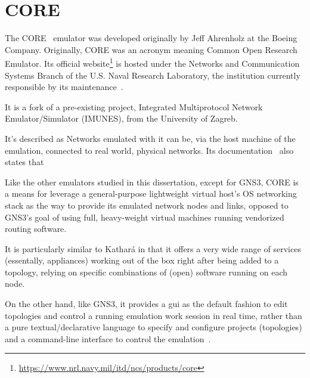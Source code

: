 \section{CORE}
\label{sec:exemulcore}

The CORE~\cite{coreemulator} emulator was developed originally by Jeff Ahrenholz at the Boeing Company.
Originally, CORE was an acronym meaning Common Open Research Emulator.
Its official website\footnote{\url{https://www.nrl.navy.mil/itd/ncs/products/core}} is hosted under the Networks and Communication Systems Branch of the U.S. Naval Research Laboratory, the institution currently responsible by its maintenance~\cite{Peach2016AnOO}.

It is a fork of a pre-existing project, Integrated Multiprotocol Network Emulator/Simulator (IMUNES), from the University of Zagreb.

It's described as 
Networks emulated with it can be, via the host machine of the emulation, connected to real world, physical networks.
Its documentation~\cite{coreghdocs} also states that 

Like the other emulators studied in this dissertation, except for GNS3, CORE is a means for leverage a general-purpose lightweight virtual host's OS networking stack as the way to provide its emulated network nodes and links, opposed to GNS3's goal of using full, heavy-weight virtual machines running vendorized routing software.

It is particularly similar to Kathará in that it offers a very wide range of services (essentally, appliances) working out of the box right after being added to a topology, relying on specific combinations of (open) software running on each node.

On the other hand, like GNS3, it provides a \gls{gui} as the default fashion to edit topologies and control a running emulation work session in real time, rather than a pure textual/declarative language to specify and configure projects (topologies) and a command-line interface to control the emulation~\cite{coreghdocs}.


